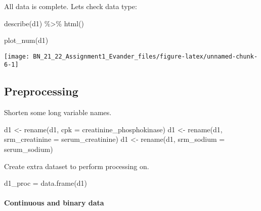 \documentclass[
]{article}
\newenvironment{Shaded}{\begin{snugshade}}{\end{snugshade}}
\newcommand{\AttributeTok}[1]{\textcolor[rgb]{0.77,0.63,0.00}{#1}}
\newcommand{\FunctionTok}[1]{\textcolor[rgb]{0.00,0.00,0.00}{#1}}
\newcommand{\NormalTok}[1]{#1}
\newcommand{\OtherTok}[1]{\textcolor[rgb]{0.56,0.35,0.01}{#1}}
\newcommand{\SpecialCharTok}[1]{\textcolor[rgb]{0.00,0.00,0.00}{#1}}
\begin{document}
All data is complete. Lets check data type:

\begin{Shaded}
\begin{Highlighting}[]
\FunctionTok{describe}\NormalTok{(d1)  }\SpecialCharTok{\%\textgreater{}\%} \FunctionTok{html}\NormalTok{()}
\end{Highlighting}
\end{Shaded}

\begin{Shaded}
\begin{Highlighting}[]
\FunctionTok{plot\_num}\NormalTok{(d1)}
\end{Highlighting}
\end{Shaded}

\begin{center}\texttt{[image: BN\_21\_22\_Assignment1\_Evander\_files/figure-latex/unnamed-chunk-6-1]} \end{center}
\newpage

\hypertarget{preprocessing}{%
\subsection{Preprocessing}\label{preprocessing}}

Shorten some long variable names.

\begin{Shaded}
\begin{Highlighting}[]
\NormalTok{d1 }\OtherTok{\textless{}{-}} \FunctionTok{rename}\NormalTok{(d1, }\AttributeTok{cpk =}\NormalTok{ creatinine\_phosphokinase)}
\NormalTok{d1 }\OtherTok{\textless{}{-}} \FunctionTok{rename}\NormalTok{(d1, }\AttributeTok{srm\_creatinine =}\NormalTok{ serum\_creatinine)}
\NormalTok{d1 }\OtherTok{\textless{}{-}} \FunctionTok{rename}\NormalTok{(d1, }\AttributeTok{srm\_sodium =}\NormalTok{ serum\_sodium)}
\end{Highlighting}
\end{Shaded}

Create extra dataset to perform processing on.

\begin{Shaded}
\begin{Highlighting}[]
\NormalTok{d1\_proc }\OtherTok{=} \FunctionTok{data.frame}\NormalTok{(d1)}
\end{Highlighting}
\end{Shaded}

\hypertarget{continuous-and-binary-data}{%
\paragraph{Continuous and binary
data}\label{continuous-and-binary-data}}
\end{document}
